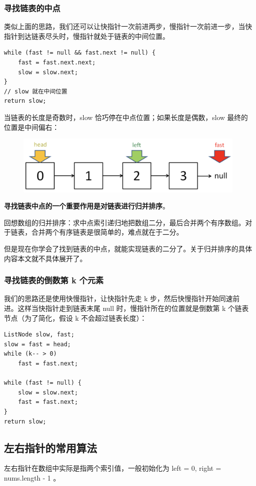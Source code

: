 \documentclass[12pt]{article}
\begin{document}
\subsubsection{寻找链表的中点}
类似上面的思路，我们还可以让快指针一次前进两步，慢指针一次前进一步，当快指针到达链表尽头时，慢指针就处于链表的中间位置。
\begin{lstlisting}
while (fast != null && fast.next != null) {
    fast = fast.next.next;
    slow = slow.next;
}
// slow 就在中间位置
return slow;
\end{lstlisting}

当链表的长度是奇数时，slow 恰巧停在中点位置；如果长度是偶数，slow 最终的位置是中间偏右：
\begin{figure}[H]
    \centering
    \includegraphics[width=.6\textwidth]{fig/Double_Pointers_4.png}
\end{figure}
	
\textbf{寻找链表中点的一个重要作用是对链表进行归并排序}。

回想数组的归并排序：求中点索引递归地把数组二分，最后合并两个有序数组。对于链表，合并两个有序链表是很简单的，难点就在于二分。

但是现在你学会了找到链表的中点，就能实现链表的二分了。关于归并排序的具体内容本文就不具体展开了。

\subsubsection{寻找链表的倒数第 k 个元素}
我们的思路还是使用快慢指针，让快指针先走 k 步，然后快慢指针开始同速前进。这样当快指针走到链表末尾 null 时，慢指针所在的位置就是倒数第 k 个链表节点（为了简化，假设 k 不会超过链表长度）：
\begin{lstlisting}
ListNode slow, fast;
slow = fast = head;
while (k-- > 0) 
    fast = fast.next;

while (fast != null) {
    slow = slow.next;
    fast = fast.next;
}
return slow;
\end{lstlisting}

\subsection{左右指针的常用算法}
左右指针在数组中实际是指两个索引值，一般初始化为 left = 0, right = nums.length - 1 。
\end{document}
